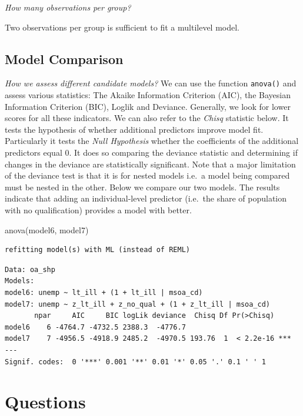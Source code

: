 \documentclass[
  letterpaper,
  DIV=11,
  numbers=noendperiod,
  oneside]{scrreprt}
\newenvironment{Shaded}{\begin{snugshade}}{\end{snugshade}}
\newcommand{\FunctionTok}[1]{\textcolor[rgb]{0.28,0.35,0.67}{#1}}
\newcommand{\NormalTok}[1]{\textcolor[rgb]{0.00,0.23,0.31}{#1}}
\begin{document}
\emph{How many observations per group?}

Two observations per group is sufficient to fit a multilevel model.

\subsection{Model Comparison}\label{model-comparison}

\emph{How we assess different candidate models?} We can use the function
\texttt{anova()} and assess various statistics: The Akaike Information
Criterion (AIC), the Bayesian Information Criterion (BIC), Loglik and
Deviance. Generally, we look for lower scores for all these indicators.
We can also refer to the \emph{Chisq} statistic below. It tests the
hypothesis of whether additional predictors improve model fit.
Particularly it tests the \emph{Null Hypothesis} whether the
coefficients of the additional predictors equal 0. It does so comparing
the deviance statistic and determining if changes in the deviance are
statistically significant. Note that a major limitation of the deviance
test is that it is for nested models i.e.~a model being compared must be
nested in the other. Below we compare our two models. The results
indicate that adding an individual-level predictor (i.e.~the share of
population with no qualification) provides a model with better.

\begin{Shaded}
\begin{Highlighting}[]
\FunctionTok{anova}\NormalTok{(model6, model7)}
\end{Highlighting}
\end{Shaded}

\begin{verbatim}
refitting model(s) with ML (instead of REML)
\end{verbatim}

\begin{verbatim}
Data: oa_shp
Models:
model6: unemp ~ lt_ill + (1 + lt_ill | msoa_cd)
model7: unemp ~ z_lt_ill + z_no_qual + (1 + z_lt_ill | msoa_cd)
       npar     AIC     BIC logLik deviance  Chisq Df Pr(>Chisq)    
model6    6 -4764.7 -4732.5 2388.3  -4776.7                         
model7    7 -4956.5 -4918.9 2485.2  -4970.5 193.76  1  < 2.2e-16 ***
---
Signif. codes:  0 '***' 0.001 '**' 0.01 '*' 0.05 '.' 0.1 ' ' 1
\end{verbatim}

\section{Questions}\label{questions-4}
\end{document}
